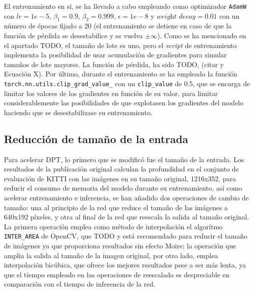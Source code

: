 El entrenamiento en sí, se ha llevado a cabo empleando como optimizador \texttt{AdamW} con $lr = 1e-5$, $\beta_1 = 0.9$, $\beta_2 = 0.999$, $\epsilon = 1e-8$ y $\textit{weight decay} = 0.01$ con un número de épocas fijado a 20 (el entrenamiento se detiene en caso de que la función de pérdida se desestabilice y se vuelva $\pm \infty$). Como se ha mencionado en el apartado TODO, el tamaño de lote es uno, pero el \textit{script} de entrenamiento implementa la posibilidad de usar acumulación de gradientes para simular tamaños de lote mayores. La función de pérdida, ha sido TODO, (citar y Ecuación X). Por último, durante el entrenamiento se ha empleado la función \texttt{torch.nn.utils.clip\_grad\_value\_} con un \texttt{clip\_value} de 0.5, que se encarga de limitar los valores de los gradientes en función de su valor, para limitar considerablemente las posibilidades de que explotasen los gradientes del modelo haciendo que se desestabilizase su entrenamiento.


%



\subsection{Reducción de tamaño de la entrada}
Para acelerar DPT, lo primero que se modificó fue el tamaño de la entrada. Los resultados de la publicación original calculan la profundidad en el conjunto de evaluación de KITTI con las imágenes en su tamaño original, 1216x352, para reducir el consumo de memoria del modelo durante su entrenamiento, así como acelerar entrenamiento e inferencia, se han añadido dos operaciones de cambio de tamaño: una al principio de la red que reduce el tamaño de las imágenes a 640x192 píxeles, y otra al final de la red que reescala la salida al tamaño original. La primera operación emplea como método de interpolación el algorítmo \texttt{INTER{\_}AREA} de OpenCV, que TODO y está recomendado para reducir el tamaño de imágenes ya que proporciona resultados sin efecto Moire; la operación que amplia la salida al tamaño de la imagen original, por otro lado, emplea interpolación bicúbica, que ofrece los mejores resultados pese a ser más lenta, ya que el tiempo empleado en las operaciones de reescalado es despreciable en comparación con el tiempo de inferencia de la red.

